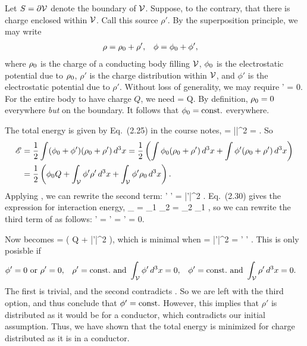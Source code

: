 \begin{solution}
	Let $S = \partial \mathcal{V}$ denote the boundary of $\mathcal{V}$.  Suppose, to the contrary, that there is charge enclosed within $\mathcal{V}$.  Call this source $\rho'$.  By the superposition principle, we may write
	\begin{align*}
		\rho &= \rho_0 + \rho', &
		\phi &= \phi_0 + \phi',
	\end{align*}
	where $\rho_0$ is the charge of a conducting body filling $\mathcal{V}$, $\phi_0$ is the electrostatic potential due to $\rho_0$, $\rho'$ is the charge distribution within $\mathcal{V}$, and $\phi'$ is the electrostatic potential due to $\rho'$.  Without loss of generality, we may require
	\beqn \label{wtf}
		\intV \rho' \dcx = 0.
	\eeqn
	For the entire body to have charge $Q$, we need
	\beq
		\int \rhoo \dcx = Q.
	\eeq
	By definition, $\rho_0 = 0$ everywhere \emph{but} on the boundary.  It follows that $\phi_0 = \text{const.}$ everywhere.

	The total energy is given by Eq.~(2.25) in the course notes,
	\beqn \label{tote}
		\sE =  \intV |\vE|^2 \dcx =  \int \phi \rho \dcx.
	\eeqn
	So
	\begin{align}
		\mathscr{E} &= \frac{1}{2} \int (\phi_0 + \phi') (\rho_0 + \rho') \dd[3]{x}
		= \frac{1}{2} \left( \int \phi_0 (\rho_0 + \rho') \dd[3]{x} + \int \phi' (\rho_0 + \rho') \dd[3]{x} \right) \notag \\
		&= \frac{1}{2} \left( \phi_0 Q + \int_{\mathcal{V}} \phi' \rho' \dd[3]{x} + \int_{\mathcal{V}} \phi' \rho_0 \dd[3]{x} \right). \label{3terms}
	\end{align}
	Applying , we can rewrite the second term:
	\beq
		\intV \phi' \rho' \dcx =  \intV |\vE'|^2 \dcx {}.
	\eeq
	Eq.~(2.30) gives the expression for interaction energy,
	\beq
		\sE_ = \int \rho_1 \phi_2 \dcx = \int \rho_2 \phi_1 \dcx,
	\eeq
	so we can rewrite the third term of  as follows:
	\beq
		\intV \phi' \rhoo \dcx = \intV \phio \rho' \dcx = \phio \intV \rho' \dcx = 0.
	\eeq
	
	Now  becomes
	\beq
		\sE =  \left( \phio Q +  \intV |\vE'|^2 \dcx \right),
	\eeq
	which is minimal when
	 =  \intV |\vE'|^2 \dcx = \intV \phi' \rho' \dcx.
	\eeq
	This is only posisble if
	\begin{align*}
		\phi' = 0 &\text{ or } \rho' = 0, &
		\rho' = \text{const.} &\text{ and } \int_{\mathcal{V}} \phi' \dd[3]{x} = 0, &
		\phi' = \text{const.} &\text{ and } \int_{\mathcal{V}} \rho' \dd[3]{x} = 0.
	\end{align*}
	The first is trivial, and the second contradicts .  So we are left with the third option, and thus conclude that $\phi' = \text{const.}$  However, this implies that $\rho'$ is distributed as it would be for a conductor, which contradicts our initial assumption.  Thus, we have shown that the total energy is minimized for charge distributed as it is in a conductor.
\end{solution}